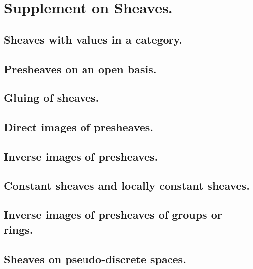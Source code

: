 \documentclass[10pt,oneside]{amsart}
\begin{document}
    \section{Supplement on Sheaves.}

        \subsection{Sheaves with values in a category.}
        

        \subsection{Presheaves on an open basis.}
        

        \subsection{Gluing of sheaves.}
        

        \subsection{Direct images of presheaves.}
        

        \subsection{Inverse images of presheaves.}
        

        \subsection{Constant sheaves and locally constant sheaves.}
        

        \subsection{Inverse images of presheaves of groups or rings.}
        

        \subsection{Sheaves on pseudo-discrete spaces.}
        
\end{document}
